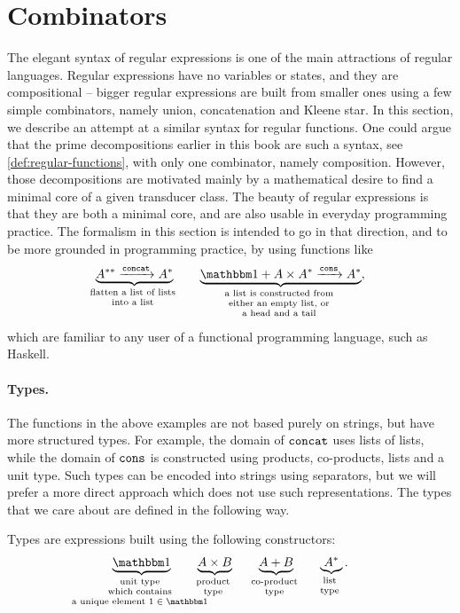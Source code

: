 \section{Combinators}
\label{sec:regular-list-functions}

The elegant syntax of regular expressions is one of the main attractions of regular languages. Regular expressions have no variables or states, and they are compositional -- bigger regular expressions are built from smaller ones using a few simple combinators, namely union, concatenation and Kleene star. In this section, we describe an attempt at a similar syntax for regular functions. One could argue that the prime decompositions earlier in this book are such a syntax, see \cref{def:regular-functions}, with only one combinator, namely composition. However, those decompositions are motivated mainly by a mathematical desire to find a  minimal core of a given transducer class. The beauty of regular expressions is that they are both a minimal core, and are also  usable in everyday programming practice. The formalism in this section is intended to go in that direction, and to be more grounded in programming practice, by using  functions like 
\begin{align*}
 \myunderbrace{A^{**} \xrightarrow {\concatterm} A^*}{flatten a list of lists \\ into a list} \qquad \myunderbrace{\onetype + A \times A^* \xrightarrow {\consterm} A^*}{a list is constructed from \\ either an empty list, or \\ a head and a tail},
\end{align*}
which are familiar to any user of a functional programming language, such as  Haskell.

\paragraph*{Types.} The functions in the above examples are not based purely on strings, but have more structured types. For example, the domain of $\mathtt{concat}$ uses lists of lists, while the domain of $\mathtt{cons}$ is constructed using products, co-products, lists and a unit type. Such types can be encoded into strings using separators, but we will prefer a more direct approach which does not use such representations. The types that we care about are defined in the following way. 
\begin{definition}
    [Types]\label{def:types} Types are expressions built using the following constructors:
\begin{align*}
    \myunderbrace{\onetype}{unit  type \\ which contains \\ a unique element $1 \in \onetype$} 
\qquad
\myunderbrace{A \times B}{product \\ type}
\qquad
\myunderbrace{A + B}{co-product \\ type}
\qquad
\myunderbrace{A^*}{list \\ type}.
\end{align*}
\end{definition}

